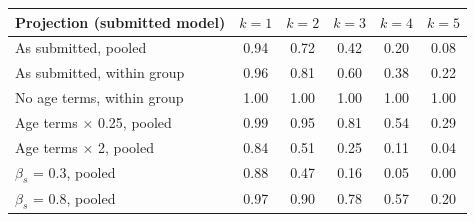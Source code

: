 \begin{tabular}{lccccc}
\toprule
Projection (submitted model) & $k=1$ & $k=2$ & $k=3$ & $k=4$ & $k=5$ \\
\midrule
As submitted, pooled & 0.94 & 0.72 & 0.42 & 0.20 & 0.08 \\
As submitted, within group & 0.96 & 0.81 & 0.60 & 0.38 & 0.22 \\
No age terms, within group & 1.00 & 1.00 & 1.00 & 1.00 & 1.00 \\
Age terms $\times$ 0.25, pooled & 0.99 & 0.95 & 0.81 & 0.54 & 0.29 \\
Age terms $\times$ 2, pooled & 0.84 & 0.51 & 0.25 & 0.11 & 0.04 \\
$\beta_s$ = 0.3, pooled & 0.88 & 0.47 & 0.16 & 0.05 & 0.00 \\
$\beta_s$ = 0.8, pooled & 0.97 & 0.90 & 0.78 & 0.57 & 0.20 \\
\bottomrule
\end{tabular}
